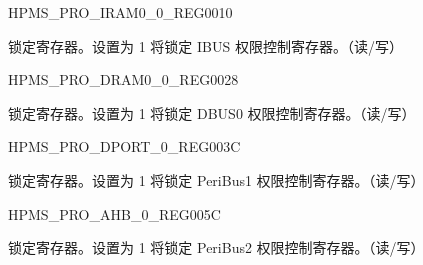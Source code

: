 \begin{register}{H}{PMS\_PRO\_IRAM0\_0\_REG}{\hexprefix{}0010}\label{regdesc:PMSPROIRAM00REG}
%
%
\regnewline%
\begin{regdesc}\begin{reglist}
\label{fielddesc:PMSPROIRAM0LOCK}\item [PMS\_PRO\_IRAM0\_LOCK] 锁定寄存器。设置为 1 将锁定 IBUS 权限控制寄存器。（读/写）
\end{reglist}\end{regdesc}
\end{register}


\begin{register}{H}{PMS\_PRO\_DRAM0\_0\_REG}{\hexprefix{}0028}\label{regdesc:PMSPRODRAM00REG}
%
%
\regnewline%
\begin{regdesc}\begin{reglist}
\label{fielddesc:PMSPRODRAM0LOCK}\item [PMS\_PRO\_DRAM0\_LOCK] 锁定寄存器。设置为 1 将锁定 DBUS0 权限控制寄存器。（读/写）
\end{reglist}\end{regdesc}
\end{register}


\begin{register}{H}{PMS\_PRO\_DPORT\_0\_REG}{\hexprefix{}003C}\label{regdesc:PMSPRODPORT0REG}
%
%
\regnewline%
\begin{regdesc}\begin{reglist}
\label{fielddesc:PMSPRODPORTLOCK}\item [PMS\_PRO\_DPORT\_LOCK] 锁定寄存器。设置为 1 将锁定 PeriBus1 权限控制寄存器。（读/写）
\end{reglist}\end{regdesc}
\end{register}


\begin{register}{H}{PMS\_PRO\_AHB\_0\_REG}{\hexprefix{}005C}\label{regdesc:PMSPROAHB0REG}
%
%
\regnewline%
\begin{regdesc}\begin{reglist}
\label{fielddesc:PMSPROAHBLOCK}\item [PMS\_PRO\_AHB\_LOCK] 锁定寄存器。设置为 1 将锁定 PeriBus2 权限控制寄存器。（读/写）
\end{reglist}\end{regdesc}
\end{register}


